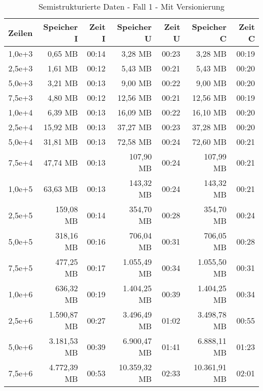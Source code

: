 \begin{table}
    \centering
    \begin{tabular}{|r|r|r|r|r|r|r|}
        \hline
        \textbf{Zeilen} & \textbf{Speicher I} & \textbf{Zeit I} & \textbf{Speicher U} & \textbf{Zeit U} & \textbf{Speicher C} & \textbf{Zeit C} \\ \hline
        1,0e+3 & 0,65 MB        & 00:14 & 3,28 MB       & 00:23 & 3,28 MB       & 00:19 \\ \hline
        2,5e+3 & 1,61 MB        & 00:12 & 5,43 MB       & 00:21 & 5,43 MB       & 00:20 \\ \hline
        5,0e+3 & 3,21 MB        & 00:13 & 9,00 MB       & 00:22 & 9,00 MB       & 00:20 \\ \hline
        7,5e+3 & 4,80 MB        & 00:12 & 12,56 MB      & 00:21 & 12,56 MB      & 00:19 \\ \hline
        1,0e+4 & 6,39 MB        & 00:13 & 16,09 MB      & 00:22 & 16,10 MB      & 00:20 \\ \hline
        2,5e+4 & 15,92 MB       & 00:13 & 37,27 MB      & 00:23 & 37,28 MB      & 00:20 \\ \hline
        5,0e+4 & 31,81 MB       & 00:13 & 72,58 MB      & 00:24 & 72,60 MB      & 00:21 \\ \hline
        7,5e+4 & 47,74 MB       & 00:13 & 107,90 MB     & 00:24 & 107,99 MB     & 00:21 \\ \hline
        1,0e+5 & 63,63 MB       & 00:13 & 143,32 MB     & 00:24 & 143,32 MB     & 00:21 \\ \hline
        2,5e+5 & 159,08 MB      & 00:14 & 354,70 MB     & 00:28 & 354,70 MB     & 00:24 \\ \hline
        5,0e+5 & 318,16 MB      & 00:16 & 706,04 MB     & 00:31 & 706,05 MB     & 00:28 \\ \hline
        7,5e+5 & 477,25 MB      & 00:17 & 1.055,49 MB   & 00:34 & 1.055,50 MB   & 00:31 \\ \hline
        1,0e+6 & 636,32 MB      & 00:19 & 1.404,25 MB   & 00:39 & 1.404,25 MB   & 00:34 \\ \hline
        2,5e+6 & 1.590,87 MB    & 00:27 & 3.496,49 MB   & 01:02 & 3.498,78 MB   & 00:55 \\ \hline
        5,0e+6 & 3.181,53 MB    & 00:39 & 6.900,47 MB   & 01:41 & 6.888,11 MB   & 01:23 \\ \hline
        7,5e+6 & 4.772,39 MB    & 00:53 & 10.359,32 MB  & 02:33 & 10.361,91 MB  & 02:01 \\ \hline
    \end{tabular}
    \caption{Semistrukturierte Daten - Fall 1 - Mit Versionierung}
\end{table}


